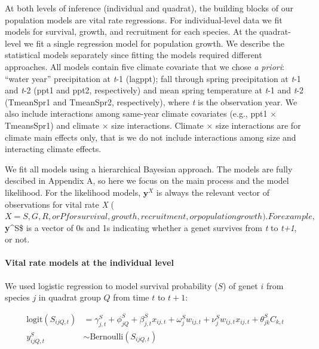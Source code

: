 \documentclass[12pt,]{article}
\begin{document}
At both levels of inference (individual and quadrat), the building
blocks of our population models are vital rate regressions. For
individual-level data we fit models for survival, growth, and
recruitment for each species. At the quadrat-level we fit a single
regression model for population growth. We describe the statistical
models separately since fitting the models required different
approaches. All models contain five climate covariate that we chose
\emph{a priori}: ``water year'' precipitation at \emph{t}-1 (lagppt);
fall through spring precipitation at \emph{t}-1 and \emph{t}-2 (ppt1 and
ppt2, respectively) and mean spring temperature at \emph{t}-1 and
\emph{t}-2 (TmeanSpr1 and TmeanSpr2, respectively), where \emph{t} is
the observation year. We also include interactions among same-year
climate covariates (e.g., ppt1 $\times$ TmeansSpr1) and climate $\times$
size interactions. Climate $\times$ size interactions are for climate
main effects only, that is we do not include interactions among size and
interacting climate effects.


We fit all models using a hierarchical Bayesian approach. The models are
fully descibed in Appendix A, so here we focus on the main process and
the model likelihood. For the likelihood models, $\textbf{y}^X$ is
always the relevant vector of observations for vital rate \emph{X}
($X = S, G, R, or P for survival, growth, recruitment, or population growth). For example, $\textbf{y}\^{}S\$
is a vector of 0s and 1s indicating whether a genet survives from
\emph{t} to \emph{t+1}, or not.

\paragraph{Vital rate models at the individual
level}\label{vital-rate-models-at-the-individual-level}

We used logistic regression to model survival probability ($S$) of genet
$i$ from species $j$ in quadrat group $Q$ from time $t$ to $t+1$:

\begin{align}
\text{logit}(S_{ijQ,t}) &= \gamma^{S}_{j,t} + \phi^{S}_{jQ} + \beta^{S}_{j,t}x_{ij,t} + \omega^{S}_{j}w_{ij,t} + \nu^{S}_{j}w_{ij,t}x_{ij,t} + \theta^{S}_{jk}C_{k,t} \\
y^{S}_{ijQ,t} &\sim \text{Bernoulli}(S_{ijQ,t})
\end{align}
\end{document}
